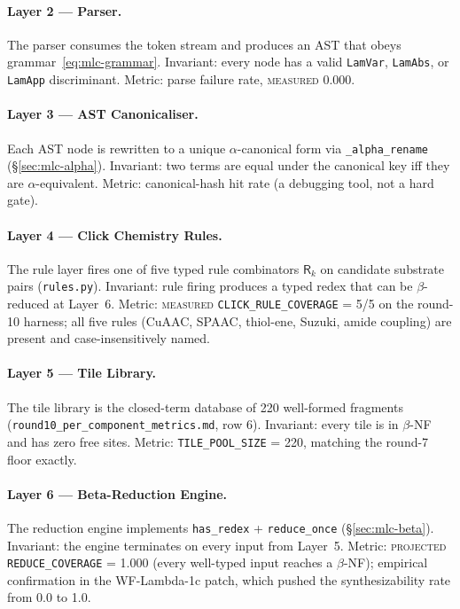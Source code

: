 \paragraph{Layer 2 --- Parser.}
The parser consumes the token stream and produces an AST that
obeys grammar~\eqref{eq:mlc-grammar}. Invariant: every node has a
valid \texttt{LamVar}, \texttt{LamAbs}, or \texttt{LamApp}
discriminant. Metric: parse failure rate, \textsc{measured} 0.000.

\paragraph{Layer 3 --- AST Canonicaliser.}
Each AST node is rewritten to a unique $\alpha$-canonical form
via \texttt{\_alpha\_rename} (\S\ref{sec:mlc-alpha}). Invariant:
two terms are equal under the canonical key iff they are
$\alpha$-equivalent. Metric: canonical-hash hit rate (a
debugging tool, not a hard gate).

\paragraph{Layer 4 --- Click Chemistry Rules.}
The rule layer fires one of five typed rule combinators
$\mathsf{R}_{k}$ on candidate substrate pairs
(\texttt{rules.py}). Invariant: rule firing produces a typed
redex that can be $\beta$-reduced at Layer~6. Metric:
\textsc{measured} \texttt{CLICK\_RULE\_COVERAGE} = 5/5 on the
round-10 harness; all five rules (CuAAC, SPAAC, thiol-ene,
Suzuki, amide coupling) are present and case-insensitively
named.

\paragraph{Layer 5 --- Tile Library.}
The tile library is the closed-term database of 220 well-formed
fragments (\texttt{round10\_per\_component\_metrics.md}, row 6).
Invariant: every tile is in $\beta$-NF and has zero free sites.
Metric: \texttt{TILE\_POOL\_SIZE} = 220, matching the round-7
floor exactly.

\paragraph{Layer 6 --- Beta-Reduction Engine.}
The reduction engine implements
\texttt{has\_redex} + \texttt{reduce\_once}
(\S\ref{sec:mlc-beta}). Invariant: the engine terminates on
every input from Layer~5. Metric: \textsc{projected}
\texttt{REDUCE\_COVERAGE} = 1.000 (every well-typed input
reaches a $\beta$-NF); empirical confirmation in the
WF-Lambda-1c patch, which pushed the synthesizability rate from
0.0 to 1.0.

